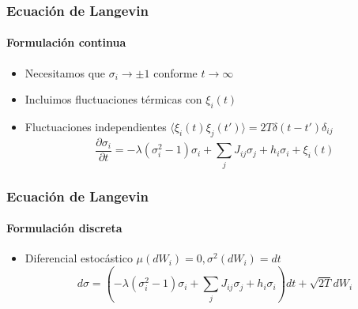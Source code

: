 \documentclass[11pt]{beamer}
\begin{document}
\begin{frame}
\frametitle{Ecuación de Langevin}
\framesubtitle{Formulación continua}
\begin{itemize}
	\item Necesitamos que $\sigma_i \rightarrow \pm 1$ conforme $t \rightarrow \infty$
	\item Incluimos fluctuaciones térmicas con $\xi_i(t)$
	\item Fluctuaciones independientes $\langle \xi_i(t) \xi_j(t') \rangle = 2T\delta(t-t')\delta_{ij}$
	\begin{displaymath}
	\frac{\partial\sigma_i}{\partial t} = -\lambda(\sigma_i^2-1)\sigma_i + \sum_j J_{ij}\sigma_j + h_i\sigma_i + \xi_i(t)
	\end{displaymath}	
\end{itemize}
\end{frame}
\begin{frame}
\frametitle{Ecuación de Langevin}
\framesubtitle{Formulación discreta}
\begin{itemize}
	\item Diferencial estocástico $\mu(dW_i) = 0, \sigma^2(dW_i) = dt$
	\begin{displaymath}
	d\sigma = \left( -\lambda(\sigma_i^2 - 1)\sigma_i +  \sum_j J_{ij} \sigma_j + h_i\sigma_i \right) dt + \sqrt{2T}dW_i
	\end{displaymath}	
\end{itemize}
\end{frame}
\end{document}
